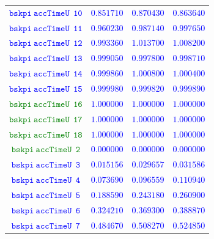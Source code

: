\documentclass[10pt,a4paper]{article}
\begin{document}
\begin{table}[h!]
{\begin{tabular}{cccc}
\textcolor{blue}{$\mathtt{bskpi~accTimeU~~10}$} & \textcolor{blue}{$0.851710$}& \textcolor{blue}{$0.870430$}& \textcolor{blue}{$0.863640$}\\
\textcolor{blue}{$\mathtt{bskpi~accTimeU~~11}$} & \textcolor{blue}{$0.960230$}& \textcolor{blue}{$0.987140$}& \textcolor{blue}{$0.997650$}\\
\textcolor{blue}{$\mathtt{bskpi~accTimeU~~12}$} & \textcolor{blue}{$0.993360$}& \textcolor{blue}{$1.013700$}& \textcolor{blue}{$1.008200$}\\
\textcolor{blue}{$\mathtt{bskpi~accTimeU~~13}$} & \textcolor{blue}{$0.999050$}& \textcolor{blue}{$0.997800$}& \textcolor{blue}{$0.998710$}\\
\textcolor{blue}{$\mathtt{bskpi~accTimeU~~14}$} & \textcolor{blue}{$0.999860$}& \textcolor{blue}{$1.000800$}& \textcolor{blue}{$1.000400$}\\
\textcolor{blue}{$\mathtt{bskpi~accTimeU~~15}$} & \textcolor{blue}{$0.999980$}& \textcolor{blue}{$0.999820$}& \textcolor{blue}{$0.999890$}\\
\textcolor{Green}{$\mathtt{bskpi~accTimeU~~16}$} & \textcolor{blue}{$1.000000$}& \textcolor{blue}{$1.000000$}& \textcolor{blue}{$1.000000$}\\
\textcolor{Green}{$\mathtt{bskpi~accTimeU~~17}$} & \textcolor{blue}{$1.000000$}& \textcolor{blue}{$1.000000$}& \textcolor{blue}{$1.000000$}\\
\textcolor{Green}{$\mathtt{bskpi~accTimeU~~18}$} & \textcolor{blue}{$1.000000$}& \textcolor{blue}{$1.000000$}& \textcolor{blue}{$1.000000$}\\
\textcolor{Green}{$\mathtt{bskpi~accTimeU~~2}$} & \textcolor{blue}{$0.000000$}& \textcolor{blue}{$0.000000$}& \textcolor{blue}{$0.000000$}\\
\textcolor{blue}{$\mathtt{bskpi~accTimeU~~3}$} & \textcolor{blue}{$0.015156$}& \textcolor{blue}{$0.029657$}& \textcolor{blue}{$0.031586$}\\
\textcolor{blue}{$\mathtt{bskpi~accTimeU~~4}$} & \textcolor{blue}{$0.073690$}& \textcolor{blue}{$0.096559$}& \textcolor{blue}{$0.110940$}\\
\textcolor{blue}{$\mathtt{bskpi~accTimeU~~5}$} & \textcolor{blue}{$0.188590$}& \textcolor{blue}{$0.243180$}& \textcolor{blue}{$0.260900$}\\
\textcolor{blue}{$\mathtt{bskpi~accTimeU~~6}$} & \textcolor{blue}{$0.324210$}& \textcolor{blue}{$0.369300$}& \textcolor{blue}{$0.388870$}\\
\textcolor{blue}{$\mathtt{bskpi~accTimeU~~7}$} & \textcolor{blue}{$0.484670$}& \textcolor{blue}{$0.508270$}& \textcolor{blue}{$0.524850$}\\

\end{tabular}}
\end{table}
\end{document}
